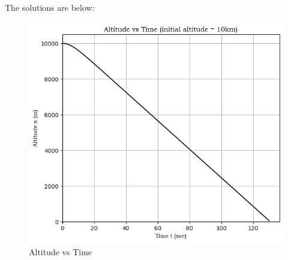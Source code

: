 \documentclass[a4paper, 14pt]{extarticle}
\begin{document}
The solutions are below:
\begin{figure}[H]
\centering
\includegraphics[width=0.5\linewidth]{10-1}
\caption{\label{10-1}Altitude vs Time}
\end{figure}
\end{document}
